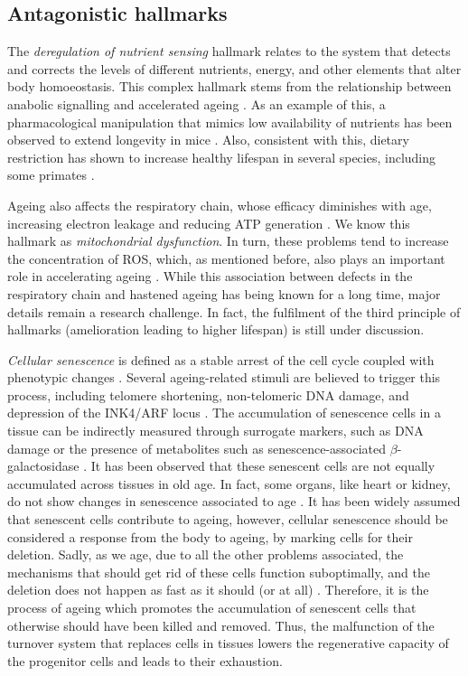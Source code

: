 \subsection{Antagonistic hallmarks} \label{ss_intro_hallmarks_secondary}

The \emph{deregulation of nutrient sensing} hallmark relates to the system that detects and corrects the levels of different nutrients, energy, and other elements that alter body homoeostasis.
This complex hallmark stems from the relationship between anabolic signalling and accelerated ageing \cite{Fontana2010}.
As an example of this, a pharmacological manipulation that mimics low availability of nutrients has been observed to extend longevity in mice \cite{Harrison2009}.
Also, consistent with this, dietary restriction has shown to increase healthy lifespan in several species, including some primates \cite{Mattison2017}.

Ageing also affects the respiratory chain, whose efficacy diminishes with age, increasing electron leakage and reducing ATP generation \cite{Green2011}.
We know this hallmark as \emph{mitochondrial dysfunction}.
In turn, these problems tend to increase the concentration of ROS, which, as mentioned before, also plays an important role in accelerating ageing \cite{Harman1965}.
While this association between defects in the respiratory chain and hastened ageing has being known for a long time, major details remain a research challenge.
In fact, the fulfilment of the third principle of hallmarks (amelioration leading to higher lifespan) is still under discussion.

\emph{Cellular senescence} is defined as a stable arrest of the cell cycle coupled with phenotypic changes \cite{Campisi2007,Kuilman2010}.
Several ageing-related stimuli are believed to trigger this process, including telomere shortening, non-telomeric DNA damage, and depression of the INK4/ARF locus \cite{Collado2007}.
The accumulation of senescence cells in a tissue can be indirectly measured through surrogate markers, such as DNA damage or the presence of metabolites such as senescence-associated $\beta$-galactosidase \cite{Dimri1995}.
It has been observed that these senescent cells are not equally accumulated across tissues in old age.
In fact, some organs, like heart or kidney, do not show changes in senescence associated to age \cite{Hoenicke2012,Kang2011,Xue2007}.
It has been widely assumed that senescent cells contribute to ageing, however, cellular senescence should be considered a response from the body to ageing, by marking cells for their deletion.
Sadly, as we age, due to all the other problems associated, the mechanisms that should get rid of these  cells function suboptimally, and the deletion does not happen as fast as it should (or at all) \cite{Calcinotto2019}.
Therefore, it is the process of ageing which promotes the accumulation of senescent cells that otherwise should have been killed and removed.
Thus, the malfunction of the turnover system that replaces cells in tissues lowers the regenerative capacity of the progenitor cells and leads to their exhaustion.

